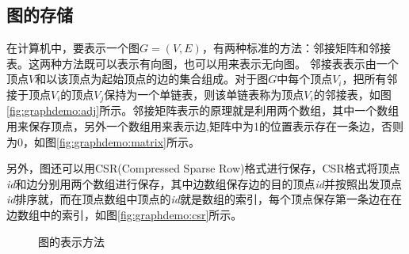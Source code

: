 \subsection{图的存储}
在计算机中，要表示一个图$G=(V,E)$，有两种标准的方法：邻接矩阵和邻接表。这两种方法既可以表示有向图，也可以用来表示无向图。
邻接表表示由一个顶点$V$和以该顶点为起始顶点的边的集合组成。对于图$G$中每个顶点$V$$_i$，把所有邻接于顶点$V$$_i$的顶点$V$$_j$保持为一个单链表，则该单链表称为顶点$V$$_i$的邻接表，如图\ref{fig:graphdemo:adj}所示。邻接矩阵表示的原理就是利用两个数组，其中一个数组用来保存顶点，另外一个数组用来表示边,矩阵中为1的位置表示存在一条边，否则为0，如图\ref{fig:graphdemo:matrix}所示。

另外，图还可以用CSR(Compressed Sparse Row)格式进行保存，CSR格式将顶点\textit{id}和边分别用两个数组进行保存，其中边数组保存边的目的顶点\textit{id}并按照出发顶点\textit{id}排序就，而在顶点数组中顶点的\textit{id}就是数组的索引，每个顶点保存第一条边在在边数组中的索引，如图\ref{fig:graphdemo:csr}所示。
\begin{figure}[htbp]
  \centering
  \caption{图的表示方法}\label{fig:graphdemo}

\end{figure}

